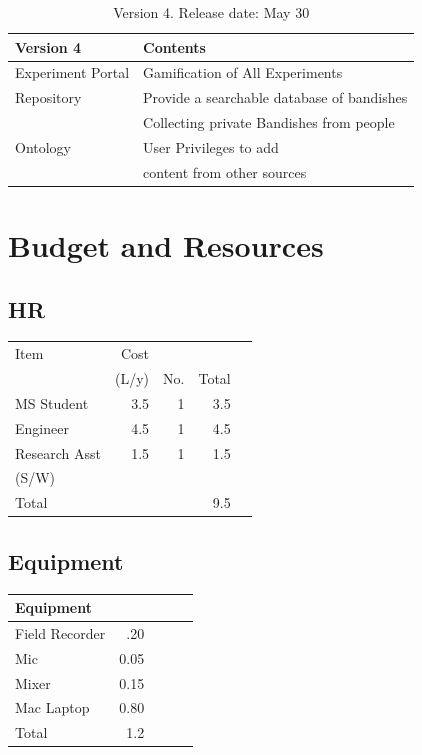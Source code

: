 \documentclass{tufte-handout}
\begin{document}
\begin{table}[h]
\begin{tabular}{ll}
\toprule
Version 4                    & Contents      \\
\midrule
Experiment Portal              & Gamification of All Experiments\\
Repository                     & Provide a searchable database of bandishes\\
 & Collecting private Bandishes from people\\
Ontology & User Privileges to add \\ 
& content from other sources\\
\bottomrule    
\end{tabular}
\caption{Version 4. Release date: May 30}
\end{table}

\section{Budget and Resources }
\label{sec-1}
\subsection{HR}
\label{sec-1-1}


\begin{center}
\begin{tabular}{lrrrl}
\hline
 Item           &   Cost  &       &         &     \\
                &  (L/y)  &  No.  &  Total  &     \\
\hline
 MS Student     &    3.5  &    1  &    3.5  &     \\
\hline
 Engineer       &    4.5  &    1  &    4.5  &     \\
\hline
 Research Asst  &    1.5  &    1  &    1.5  &     \\
 (S/W)          &         &       &         &     \\
\hline
 Total          &         &       &    9.5  &     \\
\hline
\end{tabular}
\end{center}
\subsection{Equipment}
\label{sec-1-2}



\begin{center}
\begin{tabular}{lrlll}
\hline
 Equipment       &        &     &     &     \\
\hline
 Field Recorder  &   .20  &     &     &     \\
\hline
 Mic             &  0.05  &     &     &     \\
\hline
 Mixer           &  0.15  &     &     &     \\
\hline
 Mac Laptop      &  0.80  &     &     &     \\
\hline
 Total           &   1.2  &     &     &     \\
\hline
\end{tabular}
\end{center}
\end{document}
